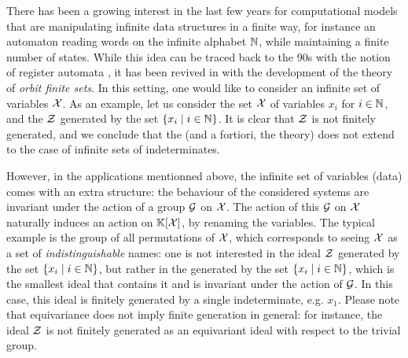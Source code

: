 \AP There has been a growing interest in the last few years for computational
models that are manipulating infinite data structures in a finite way, for
instance an automaton reading words on the infinite alphabet $\mathbb{N}$, while
maintaining a finite number of states. While this idea can be traced back to
the 90s with the notion of register automata \cite{KAFR94}, it has been revived
in with the development of the theory of \emph{orbit finite sets}. In this
setting, one would like to consider an infinite set of variables $\mathcal{X}$. As an
example, let us consider the set $\mathcal{X}$ of variables $x_i$ for $i \in \mathbb{N}$, and
the  $\mathcal{Z}$ generated by the set $\{ x_i \mid i \in \mathbb{N} \}$. It is
clear that $\mathcal{Z}$ is not finitely generated, and we conclude that the
 (and a fortiori, the 
theory) does not extend to the case of infinite sets of indeterminates.

\AP However, in the applications mentionned above, the infinite set of
variables (data) comes with an extra structure: the behaviour of the considered
systems are invariant under the action of a group $\mathcal{G}$ on $\mathcal{X}$. The action
of this $\mathcal{G}$ on $\mathcal{X}$ naturally induces an action on $\mathbb{K}[\mathcal{X}]$, by
renaming the variables. The typical example is the group of all permutations of
$\mathcal{X}$, which corresponds to seeing $\mathcal{X}$ as a set of \emph{indistinguishable}
names: one is not interested in the ideal $\mathcal{Z}$ generated by the set
$\{ x_i \mid i \in \mathbb{N} \}$, but rather in the  generated by
the set $\{ x_i \mid i \in \mathbb{N} \}$, which is the smallest ideal that contains it
and is invariant under the action of $\mathcal{G}$. In this case, this ideal is
finitely generated by a single indeterminate, e.g. $x_1$. Please note that
equivariance does not imply finite generation in general: for instance, the
ideal $\mathcal{Z}$ is not finitely generated as an equivariant ideal with respect to
the trivial group.
%
%
